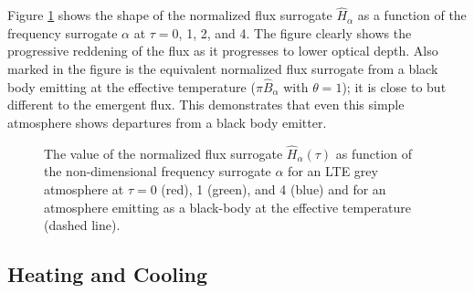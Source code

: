 Figure \ref{figure-grey-flux} shows the shape of the
normalized flux surrogate $\hat H_\alpha$ as a function of the frequency surrogate $\alpha$ at $\tau = 0$, 1, 2, and 4. The figure
clearly shows the progressive reddening of the flux as it
progresses to lower optical depth. Also marked in the figure
is the equivalent normalized flux surrogate from a black body emitting at the effective
temperature ($\pi \hat B_\alpha$ with $\theta = 1$); it is close to but different to the emergent
flux. This demonstrates that even this simple atmosphere
shows departures from a black body emitter.

\begin{figure}
\footnotesize
{}
\caption{The value of the normalized flux surrogate $\hat H_\alpha(\tau)$ as  function of the non-dimensional frequency surrogate $\alpha$ for an LTE grey
atmosphere at $\tau = 0$ (red), 1 (green), and 4 (blue) and for an atmosphere emitting as a black-body at the effective temperature (dashed
line).}
\label{figure-grey-flux}
\end{figure}

\newslide

\subsection{Heating and Cooling}

